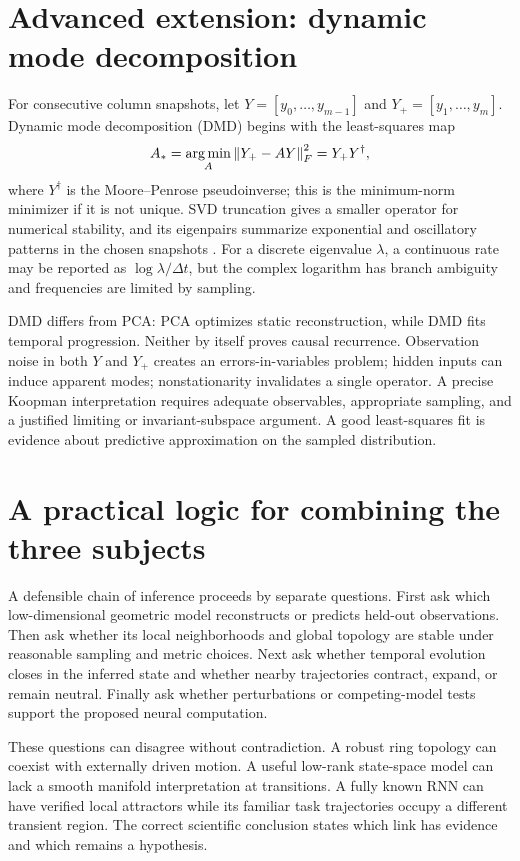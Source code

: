 \section{Advanced extension: dynamic mode decomposition}
For consecutive column snapshots, let $Y=[y_0,\ldots,y_{m-1}]$ and $Y_+=[y_1,\ldots,y_m]$. Dynamic mode decomposition (DMD) begins with the least-squares map
\begin{equation}\label{eq:dmd}
A_*=\operatorname*{arg\,min}_A\left\lVert Y_+-AY\right\rVert_F^2=Y_+Y^\dagger,
\end{equation}
where $Y^\dagger$ is the Moore--Penrose pseudoinverse; this is the minimum-norm minimizer if it is not unique. SVD truncation gives a smaller operator for numerical stability, and its eigenpairs summarize exponential and oscillatory patterns in the chosen snapshots \citep{schmid2010}. For a discrete eigenvalue $\lambda$, a continuous rate may be reported as $\log\lambda/\Delta t$, but the complex logarithm has branch ambiguity and frequencies are limited by sampling.

DMD differs from PCA: PCA optimizes static reconstruction, while DMD fits temporal progression. Neither by itself proves causal recurrence. Observation noise in both $Y$ and $Y_+$ creates an errors-in-variables problem; hidden inputs can induce apparent modes; nonstationarity invalidates a single operator. A precise Koopman interpretation requires adequate observables, appropriate sampling, and a justified limiting or invariant-subspace argument. A good least-squares fit is evidence about predictive approximation on the sampled distribution.

\section{A practical logic for combining the three subjects}
A defensible chain of inference proceeds by separate questions. First ask which low-dimensional geometric model reconstructs or predicts held-out observations. Then ask whether its local neighborhoods and global topology are stable under reasonable sampling and metric choices. Next ask whether temporal evolution closes in the inferred state and whether nearby trajectories contract, expand, or remain neutral. Finally ask whether perturbations or competing-model tests support the proposed neural computation.

These questions can disagree without contradiction. A robust ring topology can coexist with externally driven motion. A useful low-rank state-space model can lack a smooth manifold interpretation at transitions. A fully known RNN can have verified local attractors while its familiar task trajectories occupy a different transient region. The correct scientific conclusion states which link has evidence and which remains a hypothesis.

